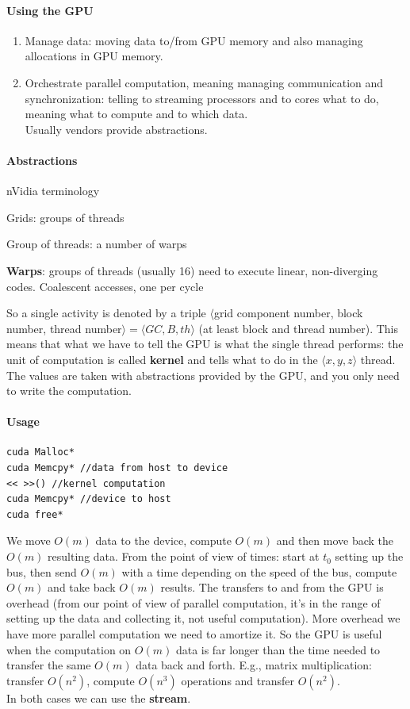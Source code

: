 \documentclass[10pt]{report}
\begin{document}
\paragraph{Using the GPU}
\begin{enumerate}
	\item Manage data: moving data to/from GPU memory and also managing allocations in GPU memory.
	\item Orchestrate parallel computation, meaning managing communication and synchronization: telling to streaming processors and to cores what to do, meaning what to compute and to which data.\\
	Usually vendors provide abstractions.
\end{enumerate}
\paragraph{Abstractions} nVidia terminology
\begin{list}{}{}
	\item Grids: groups of threads
	\item Group of threads: a number of warps
	\item \textbf{Warps}: groups of threads (usually 16) need to execute linear, non-diverging codes. Coalescent accesses, one per cycle
\end{list}
So a single activity is denoted by a triple $\langle$grid component number, block number, thread number$\rangle = \langle GC, B, th\rangle$ (at least block and thread number). This means that what we have to tell the GPU is what the single thread performs: the unit of computation is called \textbf{kernel} and tells what to do in the $\langle x,y,z\rangle$ thread. The values are taken with abstractions provided by the GPU, and you only need to write the computation.
\paragraph{Usage}
\begin{lstlisting}[style=myC]
cuda Malloc*
cuda Memcpy* //data from host to device
<< >>() //kernel computation
cuda Memcpy* //device to host
cuda free*
\end{lstlisting}
We move $O(m)$ data to the device, compute $O(m)$ and then move back the $O(m)$ resulting data. From the point of view of times: start at $t_0$ setting up the bus, then send $O(m)$ with a time depending on the speed of the bus, compute $O(m)$ and take back $O(m)$ results. The transfers to and from the GPU is overhead (from our point of view of parallel computation, it's in the range of setting up the data and collecting it, not useful computation). More overhead we have more parallel computation we need to amortize it. So the GPU is useful when the computation on $O(m)$ data is far longer than the time needed to transfer the same $O(m)$ data back and forth. E.g., matrix multiplication: transfer $O(n^2)$, compute $O(n^3)$ operations and transfer $O(n^2)$.\\
In both cases we can use the \textbf{stream}.
\end{document}
